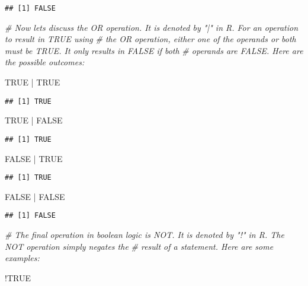 \documentclass[
]{article}
\newenvironment{Shaded}{\begin{snugshade}}{\end{snugshade}}
\newcommand{\CommentTok}[1]{\textcolor[rgb]{0.56,0.35,0.01}{\textit{#1}}}
\newcommand{\ConstantTok}[1]{\textcolor[rgb]{0.00,0.00,0.00}{#1}}
\newcommand{\SpecialCharTok}[1]{\textcolor[rgb]{0.00,0.00,0.00}{#1}}
\begin{document}
\begin{verbatim}
## [1] FALSE
\end{verbatim}

\begin{Shaded}
\begin{Highlighting}[]
\CommentTok{\# Now let\textquotesingle{}s discuss the OR operation. It is denoted by "|" in R. For an operation to result in TRUE using}
\CommentTok{\# the OR operation, either one of the operands or both must be TRUE. It only results in FALSE if both}
\CommentTok{\# operands are FALSE. Here are the possible outcomes:}

\ConstantTok{TRUE} \SpecialCharTok{|} \ConstantTok{TRUE}
\end{Highlighting}
\end{Shaded}

\begin{verbatim}
## [1] TRUE
\end{verbatim}

\begin{Shaded}
\begin{Highlighting}[]
\ConstantTok{TRUE} \SpecialCharTok{|} \ConstantTok{FALSE}
\end{Highlighting}
\end{Shaded}

\begin{verbatim}
## [1] TRUE
\end{verbatim}

\begin{Shaded}
\begin{Highlighting}[]
\ConstantTok{FALSE} \SpecialCharTok{|} \ConstantTok{TRUE}
\end{Highlighting}
\end{Shaded}

\begin{verbatim}
## [1] TRUE
\end{verbatim}

\begin{Shaded}
\begin{Highlighting}[]
\ConstantTok{FALSE} \SpecialCharTok{|} \ConstantTok{FALSE}
\end{Highlighting}
\end{Shaded}

\begin{verbatim}
## [1] FALSE
\end{verbatim}

\begin{Shaded}
\begin{Highlighting}[]
\CommentTok{\# The final operation in boolean logic is NOT. It is denoted by "!" in R. The NOT operation simply negates the}
\CommentTok{\# result of a statement. Here are some examples:}

\SpecialCharTok{!}\ConstantTok{TRUE}
\end{Highlighting}
\end{Shaded}
\end{document}
